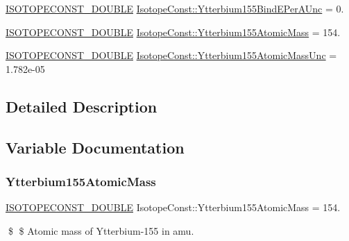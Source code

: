 \begin{DoxyCompactItemize}
\mbox{\hyperlink{group___isotope_const-_macros_ga8f45a7272ce02c0b4c65c44636ed719a}{I\+S\+O\+T\+O\+P\+E\+C\+O\+N\+S\+T\+\_\+\+D\+O\+U\+B\+LE}} \mbox{\hyperlink{group___isotope_const-_ytterbium-_yb155_ga1650ed5f15ab06d2371dd3cb0e51c467}{Isotope\+Const\+::\+Ytterbium155\+Bind\+E\+Per\+A\+Unc}} = 0.
\item 
\mbox{\hyperlink{group___isotope_const-_macros_ga8f45a7272ce02c0b4c65c44636ed719a}{I\+S\+O\+T\+O\+P\+E\+C\+O\+N\+S\+T\+\_\+\+D\+O\+U\+B\+LE}} \mbox{\hyperlink{group___isotope_const-_ytterbium-_yb155_gaa393519f6e06636f6cf29f747e2e5895}{Isotope\+Const\+::\+Ytterbium155\+Atomic\+Mass}} = 154.
\item 
\mbox{\hyperlink{group___isotope_const-_macros_ga8f45a7272ce02c0b4c65c44636ed719a}{I\+S\+O\+T\+O\+P\+E\+C\+O\+N\+S\+T\+\_\+\+D\+O\+U\+B\+LE}} \mbox{\hyperlink{group___isotope_const-_ytterbium-_yb155_gad4ff0bdba252ccd897333ab6587eb224}{Isotope\+Const\+::\+Ytterbium155\+Atomic\+Mass\+Unc}} = 1.\+782e-\/05
\end{DoxyCompactItemize}


\subsection{Detailed Description}


\subsection{Variable Documentation}
\mbox{\label{group___isotope_const-_ytterbium-_yb155_gaa393519f6e06636f6cf29f747e2e5895}} 
\subsubsection{\texorpdfstring{Ytterbium155\+Atomic\+Mass}{Ytterbium155AtomicMass}}
{\footnotesize\ttfamily \mbox{\hyperlink{group___isotope_const-_macros_ga8f45a7272ce02c0b4c65c44636ed719a}{I\+S\+O\+T\+O\+P\+E\+C\+O\+N\+S\+T\+\_\+\+D\+O\+U\+B\+LE}} Isotope\+Const\+::\+Ytterbium155\+Atomic\+Mass = 154.}

\$ \$ Atomic mass of Ytterbium-\/155 in amu. \mbox{\label{group___isotope_const-_ytterbium-_yb155_gad4ff0bdba252ccd897333ab6587eb224}} 
